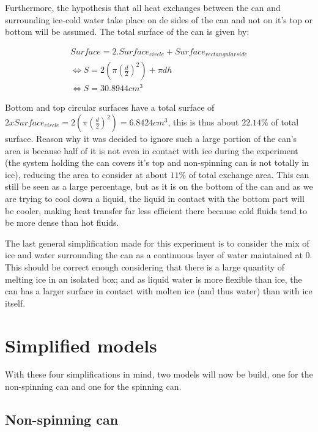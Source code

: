 \documentclass{report}
\begin{document}
	Furthermore, the hypothesis that all heat exchanges between the can and surrounding ice-cold water take place on de sides of the can and not on it's top or bottom will be assumed. The total surface of the can is given by:
	
	\begin{equation}
	\begin{gathered}
		Surface= 2.Surface_{circle} + Surface_{rectangular side} \\
		\Leftrightarrow S= 2 (\pi  (\frac{d}{2})^2) + \pi dh \\
		\Leftrightarrow S= 30.8944 cm^3
	\end{gathered}
	\end{equation}
	
	Bottom and top circular surfaces have a total surface of $2xSurface_{circle}=2 (\pi  (\frac{d}{2})^2)= 6.8424 cm^3$, this is thus about $22.14\% $ of total surface. Reason why it was decided to ignore such a large portion of the can's area is because half of it is not even in contact with ice during the experiment (the system holding the can covers it's top and non-spinning can is not totally in ice), reducing the area to consider at about $11\% $ of total exchange area. This can still be seen as a large percentage, but as it is on the bottom of the can and as we are trying to cool down a liquid, the liquid in contact with the bottom part will be cooler, making heat transfer far less efficient there because cold fluids tend to be more dense than hot fluids.
	
	The last general simplification made for this experiment is to consider the mix of ice and water surrounding the can as a continuous layer of water maintained at 0\textcelsius. This should be correct enough considering that there is a large quantity of melting ice in an isolated box; and as liquid water is more flexible than ice, the can has a larger surface in contact with molten ice (and thus water) than with ice itself.
	
	
	\section{Simplified models}\label{sm}
	
	With these four simplifications in mind, two models will now be build, one for the non-spinning can and one for the spinning can.
	
	\subsection{Non-spinning can}\label{nrc}
	
\end{document}
